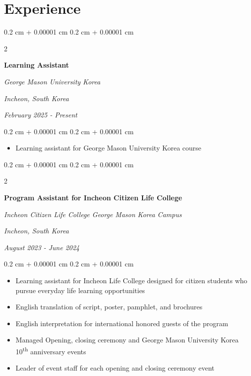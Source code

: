 \documentclass[10pt, letterpaper]{article}
\newenvironment{highlights}{
    \begin{itemize}[
        topsep=0.10 cm,
        parsep=0.10 cm,
        partopsep=0pt,
        itemsep=0pt,
        leftmargin=0.4 cm + 10pt
    ]
}{
    \end{itemize}
} %
\newenvironment{onecolentry}{
    \begin{adjustwidth}{
        0.2 cm + 0.00001 cm
    }{
        0.2 cm + 0.00001 cm
    }
}{
    \end{adjustwidth}
} %
\newenvironment{twocolentry}[2][]{
    \onecolentry
    \def\secondColumn{#2}
    \setcolumnwidth{\fill, 4.5 cm}
    \begin{paracol}{2}
}{
    \switchcolumn \raggedleft \secondColumn
    \end{paracol}
    \endonecolentry
} %
\begin{document}
    
    \section{Experience}
        
        \begin{twocolentry}{
        \textit{Incheon, South Korea}    
            
        \textit{February 2025 - Present}}
            \textbf{Learning Assistant}
            
            \textit{George Mason University Korea}
        \end{twocolentry}

        \vspace{0.10 cm}
        \begin{onecolentry}
            \begin{highlights}
                \item Learning assistant for George Mason University Korea course
            \end{highlights}
        \end{onecolentry}

        \vspace{0.2 cm}
        
        \begin{twocolentry}{
        \textit{Incheon, South Korea}    
            
        \textit{August 2023 - June 2024}}
            \textbf{Program Assistant for Incheon Citizen Life College}
            
            \textit{Incheon Citizen Life College George Mason Korea Campus}
        \end{twocolentry}

        \vspace{0.10 cm}
        \begin{onecolentry}
            \begin{highlights}
                \item Learning assistant for Incheon Life College designed for citizen students who pursue everyday life learning opportunities
                \item English translation of script, poster, pamphlet, and brochures
                \item English interpretation for international honored guests of the program
                \item Managed Opening, closing ceremony and George Mason University Korea 10\textsuperscript{th} anniversary events
                \item Leader of event staff for each opening and closing ceremony event
            \end{highlights}
        \end{onecolentry}
\end{document}
